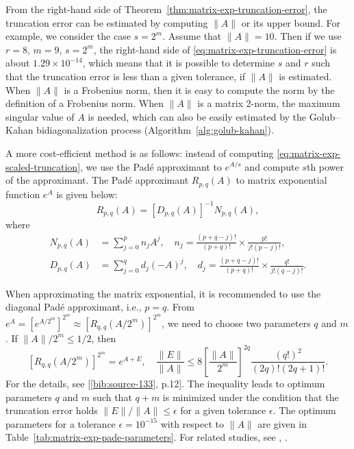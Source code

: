 {From the right-hand side of Theorem~\ref{thm:matrix-exp-truncation-error}, the truncation error can be estimated by computing $\|A\|$ or its upper bound. For example, we consider the case $s=2^m$. Assume that $\|A\|=10$. Then if we use $r=8$, $m=9$, $s=2^m$, the right-hand side of \eqref{eq:matrix-exp-truncation-error} is about $1.29\times10^{-14}$, which means that it is possible to determine $s$ and $r$ such that the truncation error is less than a given tolerance, if $\|A\|$ is estimated. When $\|A\|$ is a Frobenius norm, then it is easy to compute the norm by the definition of a Frobenius norm. When $\|A\|$ is a matrix 2-norm, the maximum singular value of $A$ is needed, which can also be easily estimated by the Golub--Kahan bidiagonalization process (Algorithm~\ref{alg:golub-kahan}).}

{A more cost-efficient method is as follows: instead of computing \eqref{eq:matrix-exp-scaled-truncation}, we use the Padé approximant to $e^{A/s}$ and compute $s$th power of the approximant. The Padé approximant $R_{p,q}(A)$ to matrix exponential function $e^A$ is given below:}
\begin{equation}\label{eq:matrix-exp-pade}R_{p,q}(A)=[D_{p,q}(A)]^{-1}N_{p,q}(A),\end{equation}
{where}
\[\begin{aligned}N_{p,q}(A)&=\sum_{j=0}^p n_jA^j,\quad n_j=\frac{(p+q-j)!}{(p+q)!}\times\frac{p!}{j!(p-j)!},\\D_{p,q}(A)&=\sum_{j=0}^q d_j(-A)^j,\quad d_j=\frac{(p+q-j)!}{(p+q)!}\times\frac{q!}{j!(q-j)!}.\end{aligned}\]

{When approximating the matrix exponential, it is recommended to use the diagonal Padé approximant, i.e., $p=q$. From $e^A=[e^{A/2^m}]^{2^m}\approx[R_{q,q}(A/2^m)]^{2^m}$, we need to choose two parameters $q$ and $m$. If $\|A\|/2^m\le1/2$, then}
\[[R_{q,q}(A/2^m)]^{2^m}=e^{A+E},\quad\frac{\|E\|}{\|A\|}\le8\left[\frac{\|A\|}{2^m}\right]^{2q}\frac{(q!)^2}{(2q)!(2q+1)!}.\]
{For the details, see [\hyperref[bib:source-133]{\ref*{bib:source-133}}, p.12]. The inequality leads to optimum parameters $q$ and $m$ such that $q+m$ is minimized under the condition that the truncation error holds $\|E\|/\|A\|\le\epsilon$ for a given tolerance $\epsilon$. The optimum parameters for a tolerance $\epsilon=10^{-15}$ with respect to $\|A\|$ are given in Table~\ref{tab:matrix-exp-pade-parameters}. For related studies, see , .}

